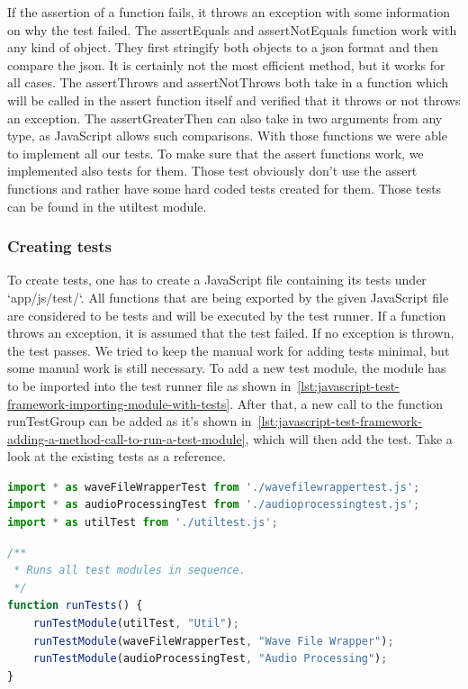 If the assertion of a function fails, it throws an exception with some information on why the test failed.
The assertEquals and assertNotEquals function work with any kind of object.
They first stringify both objects to a json format and then compare the json.
It is certainly not the most efficient method, but it works for all cases.
The assertThrows and assertNotThrows both take in a function which will be called in the assert function itself and verified that it throws or not throws an exception.
The assertGreaterThen can also take in two arguments from any type, as JavaScript allows such comparisons.
With those functions we were able to implement all our tests.
To make sure that the assert functions work, we implemented also tests for them.
Those test obviously don't use the assert functions and rather have some hard coded tests created for them.
Those tests can be found in the utiltest module.

\subsubsection{Creating tests}
To create tests, one has to create a JavaScript file containing its tests under `app/js/test/`.
All functions that are being exported by the given JavaScript file are considered to be tests and will be executed by the test runner.
If a function throws an exception, it is assumed that the test failed.
If no exception is thrown, the test passes.
We tried to keep the manual work for adding tests minimal, but some manual work is still necessary.
To add a new test module, the module has to be imported into the test runner file as shown in~\autoref{lst:javascript-test-framework-importing-module-with-tests}.
After that, a new call to the function runTestGroup can be added as it's shown in~\autoref{lst:javascript-test-framework-adding-a-method-call-to-run-a-test-module}, which will then add the test.
Take a look at the existing tests as a reference.

\begin{lstlisting}[caption={Importing a module with tests},label={lst:javascript-test-framework-importing-module-with-tests},language=JavaScript]
import * as waveFileWrapperTest from './wavefilewrappertest.js';
import * as audioProcessingTest from './audioprocessingtest.js';
import * as utilTest from './utiltest.js';
\end{lstlisting}

\begin{lstlisting}[caption={Adding a method call to run a test module},label={lst:javascript-test-framework-adding-a-method-call-to-run-a-test-module},language=JavaScript]
/**
 * Runs all test modules in sequence.
 */
function runTests() {
    runTestModule(utilTest, "Util");
    runTestModule(waveFileWrapperTest, "Wave File Wrapper");
    runTestModule(audioProcessingTest, "Audio Processing");
}
\end{lstlisting}

